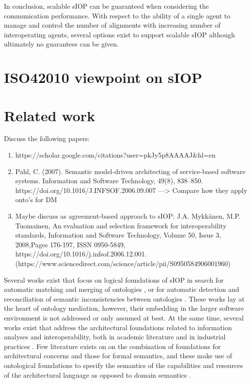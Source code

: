 \documentclass[sort&compress,preprint,authoryear,3p,twocolumn]{elsarticle}
\begin{document}
In conclusion, scalable sIOP can be guaranteed when considering the
communication performance. With respect to the ability of a single agent
to manage and control the number of alignments with increasing number of
interoperating agents, several options exist to support scalable sIOP
although ultimately no guarantees can be given.

\hypertarget{iso42010-viewpoint-on-siop}{%
\section{ISO42010 viewpoint on sIOP}\label{iso42010-viewpoint-on-siop}}

\hypertarget{related-work}{%
\section{Related work}\label{related-work}}

Discuss the following papers:

\begin{enumerate}
\def\labelenumi{\arabic{enumi}.}
\item
  https://scholar.google.com/citations?user=pkJy5p8AAAAJ\&hl=en
\item
  Pahl, C. (2007). Semantic model-driven architecting of service-based
  software systems. Information and Software Technology, 49(8),
  838--850. https://doi.org/10.1016/J.INFSOF.2006.09.007
  ---\textgreater{} Compare how they apply onto's for DM
\item
  Maybe discuss as agreement-based approach to sIOP: J.A. Mykkänen, M.P.
  Tuomainen, An evaluation and selection framework for interoperability
  standards, Information and Software Technology, Volume 50, Issue 3,
  2008,Pages 176-197, ISSN 0950-5849,
  https://doi.org/10.1016/j.infsof.2006.12.001.
  (https://www.sciencedirect.com/science/article/pii/S0950584906001960)
\end{enumerate}

Several works exist that focus on logical foundations of sIOP in search
for automatic matching and merging of ontologies
\citep{Euzenat:2013ie, Benedikt2018a, Scharffe2014}, or for automatic
detection and reconciliation of semantic inconsistencies between
ontologies \citep{Fahad2012, Diggelen:2007vd}. These works lay at the
heart of ontology mediation, however, their embedding in the larger
software environment is not addressed or only assumed at best. At the
same time, several works exist that address the architectural
foundations related to information analyses and interoperability, both
in academic literature \citep{Karagiannis2006, Raghupathi2008} and in
industrial practices \citep{ObjectManagementGroupOMG2013}. Few
literature exists on on the combination of foundations for architectural
concerns and those for formal semantics, and these make use of
ontological foundations to specify the semantics of the capabilities and
resources of the architectural language as opposed to domain semantics
\citep{Naudet2010, Azevedo2015, Carvalho2016}.
\end{document}
